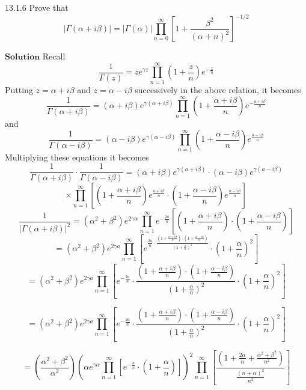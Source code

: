 \documentclass{styles/kaobook}
\begin{document}
\begin{greenbox}{13.1.6}
Prove that 
$$|\Gamma(\alpha+i \beta)|=|\Gamma(\alpha)| \prod_{n=0}^{\infty}\left[1+\frac{\beta^{2}}{(\alpha+n)^{2}}\right]^{-1 / 2}$$
\end{greenbox}

$\boxed{\textbf{Solution}}$ Recall 
$$
\frac{1}{\Gamma(z)}=z e^{\gamma z} \prod_{n=1}^{\infty}\left(1+\frac{z}{n}\right) e^{-\frac{z}{n}}
$$
Putting $z=\alpha+i \beta$ and $z=\alpha-i \beta$ successively in the above relation, it becomes
$$
\frac{1}{\Gamma(\alpha+i \beta)}=(\alpha+i \beta) e^{\gamma(\alpha+i \beta)} \prod_{n=1}^{\infty}\left(1+\frac{\alpha+i \beta}{n}\right) e^{-\frac{a+i \beta}{n}}
$$
and 
$$
\frac{1}{\Gamma(\alpha-i \beta)}=(\alpha-i \beta) e^{\gamma(\alpha-i \beta)} \prod_{n=1}^{\infty}\left(1+\frac{\alpha-i \beta}{n}\right) e^{\frac{a-i \beta}{n}}
$$
Multiplying these equations it becomes
$$
\frac{1}{\Gamma(\alpha+i \beta)} \cdot \frac{1}{\Gamma(\alpha-i \beta)}=(\alpha+i \beta) e^{\gamma(a+i \beta)} \cdot(\alpha-i \beta) e^{\gamma(a-i \beta)}$$
$$\times \prod_{n=1}^{\infty}\left[\left(1+\frac{\alpha+i \beta}{n}\right) e^{\frac{a+i \beta}{n}} \cdot\left(1+\frac{\alpha-i \beta}{n}\right) e^{\frac{\alpha-i \beta}{n}}\right]
$$
$$
\frac{1}{|\Gamma(\alpha+i \beta)|^{2}}=\left(\alpha^{2}+\beta^{2}\right) e^{2\gamma \alpha} \prod_{n=1}^{\infty} e^{-\frac{2 a}{n}}\left[\left(1+\frac{\alpha+i \beta}{n}\right) \cdot\left(1+\frac{\alpha-i \beta}{n}\right)\right]
$$
$$
=\left(\alpha^{2}+\beta^{2}\right) e^{2 \gamma a} \prod_{n=1}^{\infty}\left[e^{\frac{2 a}{n} \cdot \frac{\left(1+\frac{\alpha+i \beta}{n}\right) \cdot\left(1+\frac{\alpha-i \beta}{n}\right)}{\left(1+\frac{\alpha}{n}\right)^{2}}} \cdot\left(1+\frac{\alpha}{n}\right)^{2}\right]
$$
$$
=\left(\alpha^{2}+\beta^{2}\right) e^{2 \gamma a} \prod_{n=1}^{\infty}\left[e^{-\frac{2 a}{n}} \cdot \frac{\left(1+\frac{\alpha+i \beta}{n}\right) \cdot\left(1+\frac{\alpha-i \beta}{n}\right)}{\left(1+\frac{\alpha}{n}\right)^{2}} \cdot\left(1+\frac{\alpha}{n}\right)^{2}\right]
$$

$$
=\left(\alpha^{2}+\beta^{2}\right) e^{2 \gamma a} \prod_{n=1}^{\infty}\left[e^{-\frac{2 a}{n}} \cdot \frac{\left(1+\frac{\alpha+i \beta}{n}\right) \cdot\left(1+\frac{\alpha-i \beta}{n}\right)}{\left(1+\frac{\alpha}{n}\right)^{2}} \cdot\left(1+\frac{\alpha}{n}\right)^{2}\right]
$$

$$
=\left(\frac{\alpha^{2}+\beta^{2}}{\alpha^{2}}\right)\left(\alpha e^{\gamma \alpha} \prod_{n=1}^{\infty}\left[e^{-\frac{a}{n}} \cdot\left(1+\frac{\alpha}{n}\right)\right]\right)^{2} \prod_{n=1}^{\infty}\left[\frac{\left(1+\frac{2 \alpha}{n}+\frac{\alpha^{2}+\beta^{2}}{n^{2}}\right)}{\frac{(n+\alpha)^{2}}{n^{2}}}\right]
$$
\end{document}
